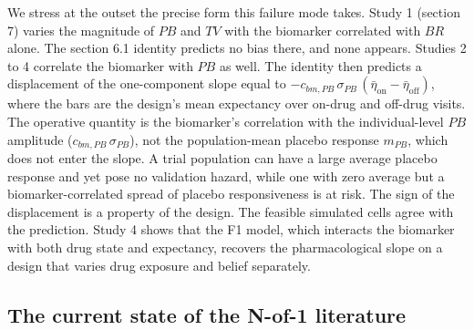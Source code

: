 \documentclass[
  11pt,
]{article}
\newcounter{none} %
\begin{document}
We stress at the outset the precise form this failure mode takes. Study 1
(section 7) varies the magnitude of \(PB\) and \(TV\) with the biomarker
correlated with \(BR\) alone. The section 6.1 identity predicts no bias
there, and none appears. Studies 2 to 4 correlate the biomarker with
\(PB\) as well. The identity then predicts a displacement of the
one-component slope equal to \(-c_{bm,PB}\,\sigma_{PB}\,
(\bar\eta_{\text{on}} - \bar\eta_{\text{off}})\), where the bars are the
design's mean expectancy over on-drug and off-drug visits. The operative
quantity is the biomarker's correlation with the individual-level \(PB\)
amplitude (\(c_{bm,PB}\,\sigma_{PB}\)), not the population-mean placebo
response \(m_{PB}\), which does not enter the slope. A trial population can
have a large average placebo response and yet pose no validation hazard,
while one with zero average but a biomarker-correlated spread of placebo
responsiveness is at risk. The sign of the displacement is a property of
the design. The feasible simulated cells agree with the prediction. Study 4
shows that the F1 model, which interacts the biomarker with both drug
state and expectancy, recovers the pharmacological slope on a design that
varies drug exposure and belief separately.

\subsection{The current state of the N-of-1 literature}\label{the-current-state-of-the-n-of-1-literature}
\end{document}
